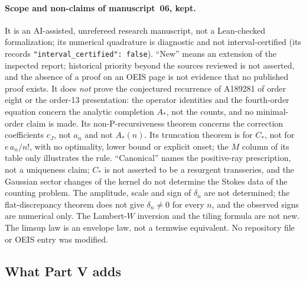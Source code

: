 \documentclass[11pt]{article}
\numberwithin{equation}{section}
\theoremstyle{definition}
\theoremstyle{remark}
\theoremstyle{definition}
\newcommand{\bcC}{C_{\!*}}
\newcommand{\bcA}{A_{\!*}}
\begin{document}
\paragraph{Scope and non-claims of manuscript~06, kept.}
It is an AI-assisted, unrefereed research manuscript, not a Lean-checked
formalization; its numerical quadrature is diagnostic and not
interval-certified (its 
records \texttt{"interval\_certified": false}). ``New'' means an extension of
the inspected report; historical priority beyond the sources reviewed is not
asserted, and the absence of a proof on an OEIS page is not evidence that no
published proof exists. It does \emph{not} prove the conjectured recurrence
of A189281 of order eight or the order-13 presentation: the operator
identities and the fourth-order equation concern the analytic completion
$\bcA$, not the counts, and no minimal-order claim is made. Its
non-P-recursiveness theorem concerns the correction coefficients $c_J$, not
$a_n$ and not $\bcA(n)$. Its truncation theorem is for $\bcC$, not for
$e\,a_n/n!$, with no optimality, lower bound or explicit onset; the $M$
column of its table only illustrates the rule. ``Canonical'' names the
positive-ray prescription, not a uniqueness claim; $\bcC$ is not asserted to
be a resurgent transseries, and the Gaussian sector changes of the kernel do
not determine the Stokes data of the counting problem. The amplitude, scale
and sign of $\delta_n$ are not determined; the flat-discrepancy theorem does
not give $\delta_n\ne0$ for every $n$, and the observed signs are numerical
only. The Lambert-$W$ inversion and the tiling formula are not new. The
limsup law is an envelope law, not a termwise equivalent. No repository file
or OEIS entry was modified.

\subsection{What Part V adds}
\label{spf:bc:sec:claims}
\end{document}
